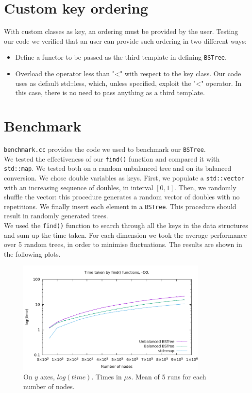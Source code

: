 \documentclass[12pt,a4paper,openany]{scrartcl}
\begin{document}
\section{Custom key ordering}
	With custom classes as key, an ordering must be provided by the user. Testing our code we verified that an user can provide such ordering in two different ways:
		
	\begin{itemize}
		\item Define a functor to be passed as the third template in defining \texttt{BSTree}.
		\item Overload the operator less than "<" with respect to the key class. Our code uses as default std::less, which, unless specified, exploit the "<" operator. In this case, there is no need to pass anything as a third template.
	\end{itemize}
	
	
	\section{Benchmark}
	\texttt{benchmark.cc} provides the code we used to benchmark our \texttt{BSTree}.\\
	We tested the effectiveness of our \texttt{find()} function and compared it with \texttt{std::map}. We tested both on a random unbalanced tree and on its balanced conversion. We chose double variables as keys. First, we populate a \texttt{std::vector} with an increasing sequence of doubles, in interval $[0,1]$. Then, we randomly shuffle the vector: this procedure generates a random vector of doubles with no repetitions. We finally insert each element in a \texttt{BSTree}. This procedure should result in randomly generated trees.\\
	
	\noindent We used the \texttt{find()} function to search through all the keys in the data structures and sum up the time taken. For each dimension we took the average performance over 5 random trees, in order to minimise fluctuations. The results are shown in the following plots.
	
    \begin{figure}[H]
        \centering
        \captionsetup{format=plain}
        \caption{On $y$ axes, $log(time)$. Times in $\mu s$. Mean of 5 runs for each number of nodes.}
        \label{fig:O0}
        \includegraphics[width=0.85\textwidth]{img/plotO0.pdf}
    \end{figure}
    
\end{document}
